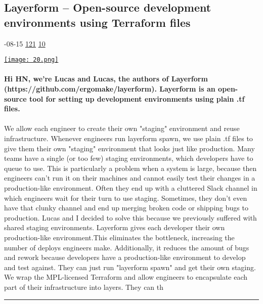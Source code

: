 \documentclass[10pt,a4paper]{article}
\begin{document}
\begin{multicols*}{2}
\begin{minipage}{\linewidth}
\subsection{Layerform – Open-source development environments using Terraform files}
\textsc{\footnotesize
{\scriptsize\faCalendar}-08-15 
{\scriptsize\faThumbsOUp}\space 
\href{http://news.ycombinator.com/item?id=37133128\&utm\_term=comment}{121} 
{\scriptsize\faComments}\space 
\href{http://news.ycombinator.com/item?id=37133128\&utm\_term=comment}{10} 
}
\par\medskip\noindent
\href{https://news.ycombinator.com/item?id=37134293\&utm\_source=hackernewsletter\&utm\_medium=email\&utm\_term=show\_hn}{
    \texttt{[image: 20.png]}
}
\end{minipage}
\paragraph{}
\textbf{Hi HN, we're Lucas and Lucas, the authors of Layerform (https://github.com/ergomake/layerform). Layerform is an open-source tool for setting up development environments using plain .tf files.}
\paragraph{}
 We allow each engineer to create their own "staging" environment and reuse infrastructure.
Whenever engineers run layerform spawn, we use plain .tf files to give them their own "staging" environment that looks just like production.
Many teams have a single (or too few) staging environments, which developers have to queue to use. This is particularly a problem when a system is large, because then engineers can't run it on their machines and cannot easily test their changes in a production-like environment. Often they end up with a cluttered Slack channel in which engineers wait for their turn to use staging. Sometimes, they don't even have that clunky channel and end up merging broken code or shipping bugs to production. Lucas and I decided to solve this because we previously suffered with shared staging environments.
Layerform gives each developer their own production-like environment.This eliminates the bottleneck, increasing the number of deploys engineers make. Additionally, it reduces the amount of bugs and rework because developers have a production-like environment to develop and test against. They can just run "layerform spawn" and get their own staging.
We wrap the MPL-licensed Terraform and allow engineers to encapsulate each part of their infrastructure into layers. They can th
\par\noindent\textcolor{red}{\rule{\linewidth}{0.2mm}}
\vfill
\null
\end{multicols*}
\end{document}
